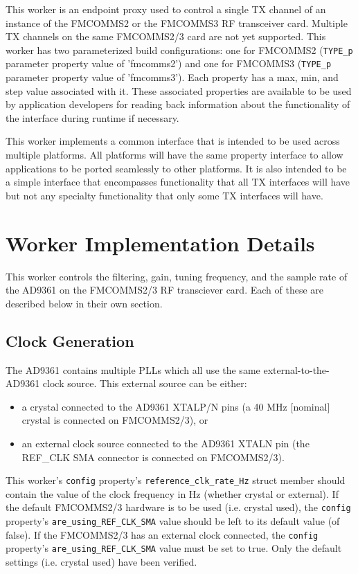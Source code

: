	This worker is an endpoint proxy used to control a single TX channel of an instance of the FMCOMMS2 or the FMCOMMS3 RF transceiver card. Multiple TX channels on the same FMCOMMS2/3 card are not yet supported. This worker has two parameterized build configurations: one for FMCOMMS2 (\verb+TYPE_p+ parameter property value of 'fmcomms2') and one for FMCOMMS3 (\verb+TYPE_p+ parameter property value of 'fmcomms3'). Each property has a max, min, and step value associated with it.  These associated properties are available to be used by application developers for reading back information about the functionality of the interface during runtime if necessary.\par\medskip
\noindent This worker implements a common interface that is intended to be used across multiple platforms. All platforms will have the same property interface to allow applications to be ported seamlessly to other platforms. It is also intended to be a simple interface that encompasses functionality that all TX interfaces will have but not any specialty functionality that only some TX interfaces will have.\par\medskip

\section*{Worker Implementation Details}
This worker controls the filtering, gain, tuning frequency, and the sample rate of the AD9361 on the FMCOMMS2/3 RF transciever card.  Each of these are described below in their own section.

\subsection*{Clock Generation}
The AD9361 contains multiple PLLs which all use the same external-to-the-AD9361 clock source. This external source can be either:
\begin{itemize}
\item a crystal connected to the AD9361 XTALP/N pins (a 40 MHz [nominal] crystal is connected on FMCOMMS2/3), or
\item an external clock source connected to the AD9361 XTALN pin (the REF\_CLK SMA connector is connected on FMCOMMS2/3).
\end{itemize}
This worker's \verb+config+ property's \verb+reference_clk_rate_Hz+ struct member should contain the value of the clock frequency in Hz (whether crystal or external). If the default FMCOMMS2/3 hardware is to be used (i.e. crystal used), the \verb+config+ property's \verb+are_using_REF_CLK_SMA+ value should be left to its default value (of false). If the FMCOMMS2/3 has an external clock connected, the \verb+config+ property's \verb+are_using_REF_CLK_SMA+ value must be set to true. Only the default settings (i.e. crystal used) have been verified.
